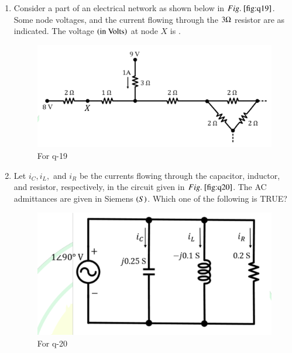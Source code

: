 \documentclass[journal,12pt,onecolumn]{IEEEtran}
\theoremstyle{remark}
\begin{document}
\begin{enumerate}
\hfill{}
\begin{multicols}{2}
\begin{enumerate}
\item $\abs{F\brak{\omega}} \le \int_{-\infty}^{\infty} \abs{f\brak{t}} dt$
\item $\abs{F\brak{\omega}} > \int_{-\infty}^{\infty} \abs{f\brak{t}} dt$
\item $\abs{F\brak{\omega}} \le \int_{-\infty}^{\infty} f\brak{t} dt$
\item $\abs{F\brak{\omega}} \ge \int_{-\infty}^{\infty} f\brak{t} dt$
\end{enumerate} 
\end{multicols}


\item Consider a part of an electrical network as shown below in $\figref{fig:q19}$. Some node voltages, and the current flowing through the $3 \ohm$ resistor are as indicated. The voltage $\left(\text{in Volts}\right)$ at node $X$ is \underline{\hspace{2cm}}.
\begin{figure}[H]
\centering
\includegraphics[width=0.6\columnwidth]{q19}
\caption{For q-19}
\label{fig:q19}
\end{figure}

\hfill{}

\begin{enumerate}
\end{enumerate}

\item Let $i_C, i_L,$ and $i_R$ be the currents flowing through the capacitor, inductor, and resistor, respectively, in the circuit given in $\figref{fig:q20}$. The AC admittances are given in Siemens $\left(S\right)$. Which one of the following is TRUE?
\begin{figure}[H]
\centering
\includegraphics[width=0.5\columnwidth]{q20}
\caption{For q-20}
\label{fig:q20}
\end{figure}


\end{enumerate}
\end{document}
